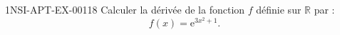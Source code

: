 \begin{exercice}{1NSI-APT-EX-001}{1}{8}
Calculer la dérivée de la fonction $f$ définie sur $\mathbb{R}$ par :
\[ f(x) = \mathrm{e}^{3x^2 + 1}. \]

\end{exercice}
